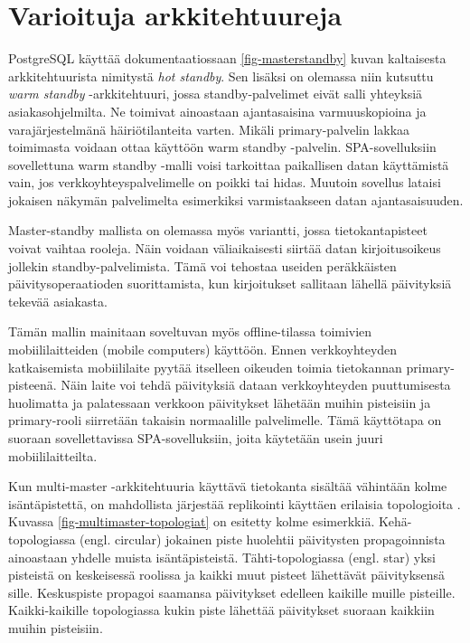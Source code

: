 \documentclass[finnish,twoside,censored,csm,sw-track-2018]{HYthesisML}
\begin{document}
\section{Varioituja arkkitehtuureja}

PostgreSQL käyttää dokumentaatiossaan \ref{fig-masterstandby} kuvan kaltaisesta arkkitehtuurista nimitystä \textit{hot standby}. Sen lisäksi on olemassa niin kutsuttu \textit{warm standby} -arkkitehtuuri, jossa standby-palvelimet eivät salli yhteyksiä asiakasohjelmilta. Ne toimivat ainoastaan ajantasaisina varmuuskopioina ja varajärjestelmänä häiriötilanteita varten. Mikäli primary-palvelin lakkaa toimimasta voidaan ottaa käyttöön warm standby -palvelin. SPA-sovelluksiin sovellettuna warm standby -malli voisi tarkoittaa paikallisen datan käyttämistä vain, jos verkkoyhteyspalvelimelle on poikki tai hidas. Muutoin sovellus lataisi jokaisen näkymän palvelimelta esimerkiksi varmistaakseen datan ajantasaisuuden.

Master-standby mallista on olemassa \citep{70ties, Tanenbaum} myös variantti, jossa tietokantapisteet voivat vaihtaa rooleja. Näin voidaan väliaikaisesti siirtää datan kirjoitusoikeus jollekin standby-palvelimista. Tämä voi tehostaa useiden peräkkäisten päivitysoperaatioden suorittamista, kun kirjoitukset sallitaan lähellä päivityksiä tekevää asiakasta.

Tämän mallin mainitaan soveltuvan myös offline-tilassa toimivien mobiililaitteiden (mobile computers) käyttöön. Ennen verkkoyhteyden katkaisemista mobiililaite pyytää itselleen oikeuden toimia tietokannan primary-pisteenä. Näin laite voi tehdä päivityksiä dataan verkkoyhteyden puuttumisesta huolimatta ja palatessaan verkkoon päivitykset lähetään muihin pisteisiin ja primary-rooli siirretään takaisin normaalille palvelimelle. Tämä käyttötapa on suoraan sovellettavissa SPA-sovelluksiin, joita käytetään usein juuri mobiililaitteilta.


Kun multi-master -arkkitehtuuria käyttävä tietokanta sisältää vähintään kolme isäntäpistettä, on mahdollista järjestää replikointi käyttäen erilaisia topologioita \citep{Kleppmann}. Kuvassa \ref{fig-multimaster-topologiat} on esitetty kolme esimerkkiä. Kehä-topologiassa (engl. circular) jokainen piste huolehtii päivitysten propagoinnista ainoastaan yhdelle muista isäntäpisteistä. Tähti-topologiassa (engl. star) yksi pisteistä on keskeisessä roolissa ja kaikki muut pisteet lähettävät päivityksensä sille. Keskuspiste propagoi saamansa päivitykset edelleen kaikille muille pisteille. Kaikki-kaikille topologiassa kukin piste lähettää päivitykset suoraan kaikkiin muihin pisteisiin.
\end{document}
